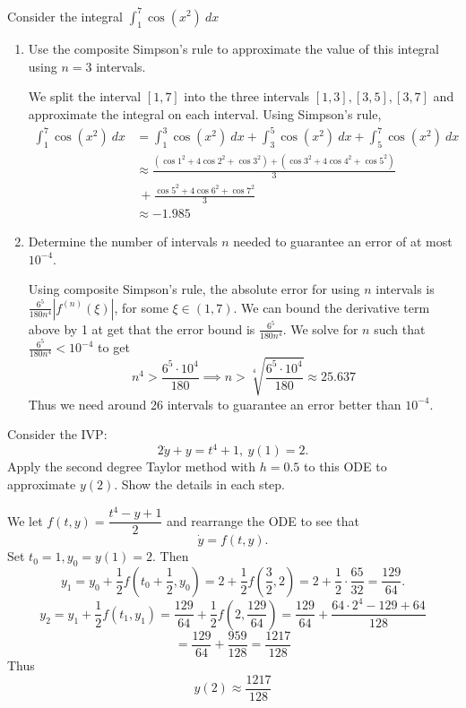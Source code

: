 \documentclass{eh-homework}
\begin{document}
    \begin{question}{3}
        Consider the integral \(\int _1^7 \cos (x^2)\ dx\)
        \begin{enumerate}[label=(\alph*)]
            \item Use the composite Simpson's rule to approximate the value of this integral using \(n=3\) intervals.
            
            We split the interval \([1,7]\) into the three intervals \([1,3], [3,5],[3,7]\) and approximate the integral on each interval. Using Simpson's rule,
            \begin{align*}
                \int _1^7 \cos (x^2)\ dx &= \int _1^3 \cos (x^2)\ dx + \int _3^5 \cos (x^2)\ dx + \int _5^7 \cos (x^2)\ dx \\
                &\approx \frac{(\cos 1^2 + 4 \cos 2^2 + \cos 3^2) + (\cos 3^2 + 4 \cos 4^2 + \cos 5^2)}{3} \\
                &\ + \frac{\cos 5^2 + 4 \cos 6^2 + \cos 7^2}{3} \\
                &\approx -1.985
            \end{align*}
            \item Determine the number of intervals \(n\) needed to guarantee an error of at most \(10^{-4}\).
            
            Using composite Simpson's rule, the absolute error for using \(n\) intervals is \(\frac{6^5}{180n^4}|f^{(n)}(\xi)|\), for some \(\xi \in (1,7)\). We can bound the derivative term above by 1 at get that the error bound is \(\frac{6^5}{180n^4}\). We solve for \(n\) such that \(\frac{6^5}{180n^4} < 10^{-4}\) to get
            \[
                n^4 > \frac{6^5 \cdot 10^4}{180} \implies n > \sqrt[4]{\frac{6^5 \cdot 10^4}{180}} \approx 25.637
            \]
            Thus we need around 26 intervals to guarantee an error better than \(10^{-4}\).
        \end{enumerate}
    \end{question}
    \begin{question}{4}
        Consider the IVP:
        \[
            2\dot y + y = t^4 + 1,\ y(1) = 2.
        \]
        Apply the second degree Taylor method with \(h = 0.5\) to this ODE to approximate \(y(2)\). Show the details in each step.

        \medskip

        We let \(f(t,y) = \dfrac{t^4 - y + 1}{2}\) and rearrange the ODE to see that
        \[
            \dot y = f(t,y).
        \]
        Set \(t_0 = 1, y_0 = y(1) = 2\). Then
        \[
            y_1 = y_0 + \frac{1}{2} f\left(t_0 + \frac{1}{2}, y_0\right) = 2 + \frac{1}{2} f\left(\frac{3}{2}, 2\right) = 2 + \frac{1}{2}\cdot\frac{65}{32} = \frac{129}{64}.
        \]
        \[
            y_2 = y_1 + \frac{1}{2}f(t_1, y_1) = \frac{129}{64} + \frac{1}{2}f\left(2, \frac{129}{64}\right) = \frac{129}{64} + \frac{64 \cdot 2^4 - 129 + 64}{128}
        \]
        \[
            = \frac{129}{64} + \frac{959}{128} = \frac{1217}{128}
        \]
        Thus
        \[
            y(2) \approx \frac{1217}{128}
        \]
    \end{question}
\end{document}
